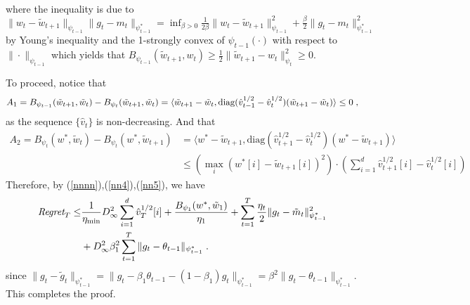 \documentclass[11pt]{article}
\makeatletter
\renewenvironment{proof}[1][\proofname]{%
   \par\pushQED{\qed}\normalfont%
   \topsep6\p@\@plus6\p@\relax
   \trivlist\item[\hskip\labelsep\bfseries#1]%
   \ignorespaces
}{%
   \popQED\endtrivlist\@endpefalse
}
\theoremstyle{k}
\makeatother
\begin{document}
\begin{proof}
\begin{equation}
\begin{aligned}
\end{aligned}
\end{equation}
where the inequality is due to $ \| w_t - \tilde{w}_{t+1}   \|_{\psi_{t-1}} \| g_t - m_t  \|_{\psi_{t-1}^*} = \inf_{ \beta > 0 }   \frac{1}{2\beta} \| w_t - \tilde{w}_{t+1} \|_{\psi_{t-1}}^2 +  \frac{\beta}{2} \| g_t - m_t  \|_{\psi_{t-1}^*}^2$ by Young's inequality and the 1-strongly convex of $\psi_{t-1}(\cdot)$ with respect to $\| \cdot \|_{\psi_{t-1}}$ which yields that $B_{\psi_{t-1}}(\tilde{w}_{t+1}, w_t )  \geq \frac{1}{2} \| \tilde{w}_{t+1} -  w_t  \|^2_{\psi_t} \geq 0$. 

To proceed, notice that
\begin{equation} \label{nn5}
\begin{aligned}
A_1 =  B_{\psi_{t-1}}(\tilde{w}_{t+1}, \tilde{w}_{t}) - B_{\psi_t}(\tilde{w}_{t+1}, \tilde{w}_{t})  = \langle \tilde{w}_{t+1} - \tilde{w}_{t} , \text{diag}(\hat{v}_{t-1}^{1/2} -\hat{v}_t^{1/2} ) ( \tilde{w}_{t+1}- \tilde{w}_{t} ) \rangle \leq 0 \;,
\end{aligned}
\end{equation}
as the sequence $\{\hat{v}_t\}$ is non-decreasing. And that
\begin{equation}  \label{nn4}
\begin{aligned}
A_2 = B_{\psi_t}( w^*, \tilde{w}_{t}) -B_{\psi_t}(w^*,  \tilde{w}_{t+1} )  &= \langle w^* - \tilde{w}_{t+1}  , \text{diag}(\hat{v}_{t+1}^{1/2} -\hat{v}_t^{1/2} ) ( w^* - \tilde{w}_{t+1}  ) \rangle\\
  & \leq ( \max_i (w^*[i] -  \tilde{w}_{t+1} [i] )^2  )\cdot ( \sum_{i=1}^d \hat{v}_{t+1}^{1/2}[i] -\hat{v}_t^{1/2}[i] )
\end{aligned}
\end{equation}
Therefore, by (\ref{nnnn}),(\ref{nn4}),(\ref{nn5}), we have
\begin{equation}\notag
\begin{aligned}
 \text{\it Regret}_T \leq & \frac{1}{\eta_{\min}} D_{\infty}^2 \sum_{i=1}^d \hat{v}_{T}^{1/2}[i] + \frac{ B_{\psi_1}(w^*, \tilde{w}_{1})}{\eta_1}
+ \sum_{t=1}^T\frac{\eta_t}{2} \| g_t - \tilde{m}_t  \|_{\psi_{t-1}^*}^2  \\
& +D_{\infty}^2 \beta_1^2  \sum_{t=1}^T \| g_t - \theta_{t-1}  \|_{\psi_{t-1}^*}  \;.
\end{aligned}
\end{equation}
since $  \| g_t - \tilde{g}_t  \|_{\psi_{t-1}^*} =  \| g_t - \beta_1 \theta_{t-1} -(1- \beta_1) g_t \|_{\psi_{t-1}^*} = \beta^2 \| g_t - \theta_{t-1}  \|_{\psi_{t-1}^*} $.
This completes the proof.

\end{proof}
\end{document}
